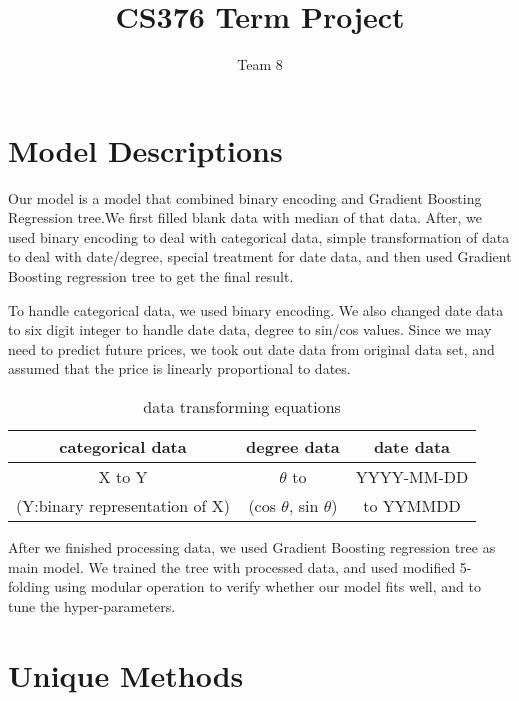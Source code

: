 \documentclass{article}
\title{CS376 Term Project}
\author{Team 8}
\begin{document}
\maketitle

\section{Model Descriptions}
Our model is a model that combined binary encoding and Gradient Boosting Regression tree.We first filled blank data with median of that data. After, we used binary encoding to deal with categorical data, simple transformation of data to deal with date/degree, special treatment for date data, and then used Gradient Boosting regression tree to get the final result.\par
To handle categorical data, we used binary encoding. We also changed date data to six digit integer to handle date data, degree to sin/cos values. Since we may need to predict future prices, we took out date data from original data set, and assumed that the price is linearly proportional to dates.\par
\begin{table} [ht]
\begin{center}
\caption{data transforming equations}
\begin{tabular} {c |c| c}
  \textbf{categorical data} & \textbf{degree data} & \textbf{date data}
\\ \hline
X to Y &  $\theta$ to  & YYYY-MM-DD\\
(Y:binary representation of X) & (cos $\theta$, sin $\theta$) & to YYMMDD\\
\end{tabular}
\end{center}
\end{table}
After we finished processing data, we used Gradient Boosting regression tree as main model. We trained the tree with processed data, and used modified 5-folding using modular operation to verify whether our model fits well, and to tune the hyper-parameters.

\section{Unique Methods}
\end{document}
